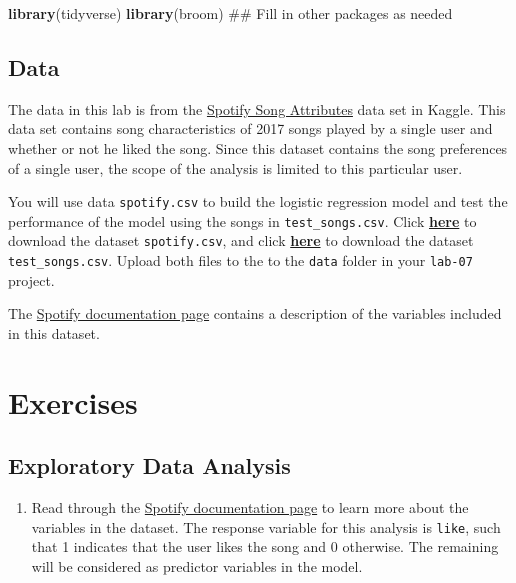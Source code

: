 \documentclass[]{book}
\newenvironment{Shaded}{\begin{snugshade}}{\end{snugshade}}
\newcommand{\KeywordTok}[1]{\textcolor[rgb]{0.13,0.29,0.53}{\textbf{#1}}}
\newcommand{\NormalTok}[1]{#1}
\providecommand{\tightlist}{%
  \setlength{\itemsep}{0pt}\setlength{\parskip}{0pt}}
\begin{document}
\begin{Shaded}
\begin{Highlighting}[]
\KeywordTok{library}\NormalTok{(tidyverse)}
\KeywordTok{library}\NormalTok{(broom)}
\NormalTok{## Fill in other packages as needed}
\end{Highlighting}
\end{Shaded}

\subsection{Data}\label{data-6}

The data in this lab is from the
\href{https://www.kaggle.com/geomack/spotifyclassification}{Spotify Song
Attributes} data set in Kaggle. This data set contains song
characteristics of 2017 songs played by a single user and whether or not
he liked the song. Since this dataset contains the song preferences of a
single user, the scope of the analysis is limited to this particular
user.

You will use data \texttt{spotify.csv} to build the logistic regression
model and test the performance of the model using the songs in
\texttt{test\_songs.csv}. Click
\href{https://www2.stat.duke.edu/courses/Spring19/sta210.001/labs/data/spotify.csv}{\textbf{here}}
to download the dataset \texttt{spotify.csv}, and click
\href{https://www2.stat.duke.edu/courses/Spring19/sta210.001/labs/data/test_songs.csv}{\textbf{here}}
to download the dataset \texttt{test\_songs.csv}. Upload both files to
the to the \texttt{data} folder in your \texttt{lab-07} project.

The
\href{https://developer.spotify.com/documentation/web-api/reference/tracks/get-audio-features/}{Spotify
documentation page} contains a description of the variables included in
this dataset.

\section{Exercises}\label{exercises-6}

\subsection{Exploratory Data
Analysis}\label{exploratory-data-analysis-1}

\begin{enumerate}
\def\labelenumi{\arabic{enumi}.}
\tightlist
\item
  Read through the
  \href{https://developer.spotify.com/documentation/web-api/reference/tracks/get-audio-features/}{Spotify
  documentation page} to learn more about the variables in the dataset.
  The response variable for this analysis is \texttt{like}, such that 1
  indicates that the user likes the song and 0 otherwise. The remaining
  will be considered as predictor variables in the model.
\end{enumerate}
\end{document}
